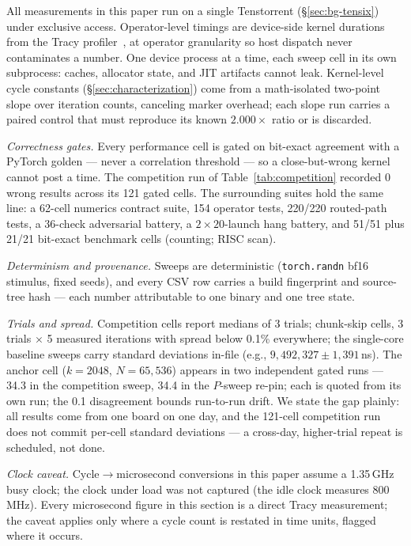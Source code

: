 All measurements in this paper run on a single Tenstorrent \bh{} \pca{}
(\S\ref{sec:bg-tensix}) under exclusive access. Operator-level timings
are device-side kernel durations from the Tracy
profiler~\cite{tracyprofiler}, at operator granularity so host dispatch never contaminates a
number. One device process at a
time, each sweep cell in its own subprocess: caches, allocator state,
and JIT artifacts cannot leak.
Kernel-level cycle constants (\S\ref{sec:characterization}) come from a
math-isolated two-point slope over iteration counts, canceling marker
overhead; each slope run carries a paired control that must reproduce its
known $2.000\times$ ratio or is discarded.

\emph{Correctness gates.} Every performance cell is gated on bit-exact
agreement with a PyTorch golden --- never a correlation threshold --- so
a close-but-wrong kernel cannot post a time. The
competition run of Table~\ref{tab:competition} recorded 0 wrong results
across its 121 gated cells. The surrounding suites hold the same line: a
62-cell numerics contract suite, 154 operator tests, 220/220 routed-path
tests, a 36-check adversarial battery, a $2\times20$-launch hang battery,
and 51/51 plus 21/21 bit-exact benchmark cells (counting; RISC scan).

\emph{Determinism and provenance.} Sweeps are deterministic
(\texttt{torch.randn} bf16 stimulus, fixed
seeds), and every CSV row carries a build fingerprint and source-tree
hash --- each number attributable to one binary and one tree state.

\emph{Trials and spread.} Competition cells report medians of 3 trials;
chunk-skip cells, 3 trials $\times$ 5 measured
iterations with spread below 0.1\% everywhere; the single-core baseline
sweeps carry standard deviations in-file (e.g.,
$9{,}492{,}327 \pm 1{,}391$\,ns). The anchor cell
($k{=}2048$, $N{=}65{,}536$) appears in two independent gated runs ---
34.3\us{} in the competition sweep, 34.4\us{} in the $P$-sweep re-pin;
each is quoted from its own run; the 0.1\us{} disagreement bounds
run-to-run drift. We state the gap plainly: all results come from one
board on one day, and the 121-cell competition run does not commit
per-cell standard deviations --- a cross-day, higher-trial repeat is
scheduled, not done.

\emph{Clock caveat.} Cycle$\to$microsecond conversions in this paper
assume a 1.35\,GHz busy clock; the clock under load was not captured
(the idle clock measures 800\,MHz). Every microsecond figure in this
section is a direct Tracy measurement; the caveat applies only where a
cycle count is restated in time units, flagged where it occurs.

